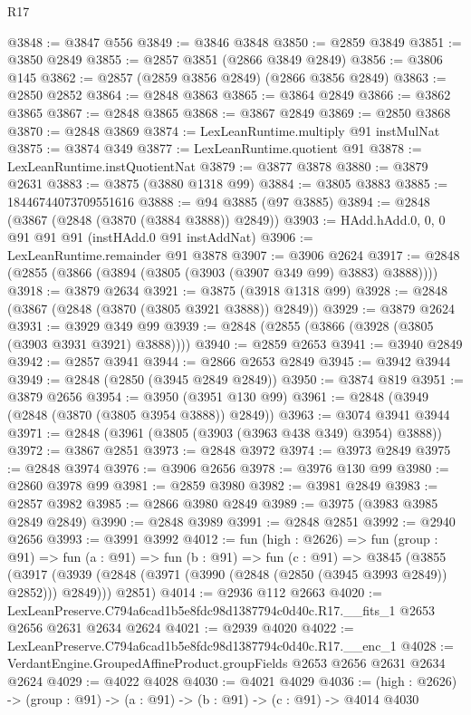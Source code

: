\begin{lexlean}{R17}
\begin{coremodule}
@3848 := @3847 @556
@3849 := @3846 @3848
@3850 := @2859 @3849
@3851 := @3850 @2849
@3855 := @2857 @3851 (@2866 @3849 @2849)
@3856 := @3806 @145
@3862 := @2857 (@2859 @3856 @2849) (@2866 @3856 @2849)
@3863 := @2850 @2852
@3864 := @2848 @3863
@3865 := @3864 @2849
@3866 := @3862 @3865
@3867 := @2848 @3865
@3868 := @3867 @2849
@3869 := @2850 @3868
@3870 := @2848 @3869
@3874 := LexLeanRuntime.multiply @91 instMulNat
@3875 := @3874 @349
@3877 := LexLeanRuntime.quotient @91
@3878 := LexLeanRuntime.instQuotientNat
@3879 := @3877 @3878
@3880 := @3879 @2631
@3883 := @3875 (@3880 @1318 @99)
@3884 := @3805 @3883
@3885 := 18446744073709551616
@3888 := @94 @3885 (@97 @3885)
@3894 := @2848 (@3867 (@2848 (@3870 (@3884 @3888)) @2849))
@3903 := HAdd.hAdd.{0, 0, 0} @91 @91 @91 (instHAdd.{0} @91 instAddNat)
@3906 := LexLeanRuntime.remainder @91 @3878
@3907 := @3906 @2624
@3917 := @2848 (@2855 (@3866 (@3894 (@3805 (@3903 (@3907 @349 @99) @3883) @3888))))
@3918 := @3879 @2634
@3921 := @3875 (@3918 @1318 @99)
@3928 := @2848 (@3867 (@2848 (@3870 (@3805 @3921 @3888)) @2849))
@3929 := @3879 @2624
@3931 := @3929 @349 @99
@3939 := @2848 (@2855 (@3866 (@3928 (@3805 (@3903 @3931 @3921) @3888))))
@3940 := @2859 @2653
@3941 := @3940 @2849
@3942 := @2857 @3941
@3944 := @2866 @2653 @2849
@3945 := @3942 @3944
@3949 := @2848 (@2850 (@3945 @2849 @2849))
@3950 := @3874 @819
@3951 := @3879 @2656
@3954 := @3950 (@3951 @130 @99)
@3961 := @2848 (@3949 (@2848 (@3870 (@3805 @3954 @3888)) @2849))
@3963 := @3074 @3941 @3944
@3971 := @2848 (@3961 (@3805 (@3903 (@3963 @438 @349) @3954) @3888))
@3972 := @3867 @2851
@3973 := @2848 @3972
@3974 := @3973 @2849
@3975 := @2848 @3974
@3976 := @3906 @2656
@3978 := @3976 @130 @99
@3980 := @2860 @3978 @99
@3981 := @2859 @3980
@3982 := @3981 @2849
@3983 := @2857 @3982
@3985 := @2866 @3980 @2849
@3989 := @3975 (@3983 @3985 @2849 @2849)
@3990 := @2848 @3989
@3991 := @2848 @2851
@3992 := @2940 @2656
@3993 := @3991 @3992
@4012 := fun (high : @2626) =>
  fun (group : @91) =>
  fun (a : @91) =>
  fun (b : @91) =>
  fun (c : @91) =>
  @3845
    (@3855
      (@3917 (@3939 (@2848 (@3971 (@3990 (@2848 (@2850 (@3945 @3993 @2849)) @2852))) @2849)))
      @2851)
@4014 := @2936 @112 @2663
@4020 := LexLeanPreserve.C794a6cad1b5e8fdc98d1387794c0d40c.R17.__fits_1
    @2653
    @2656
    @2631
    @2634
    @2624
@4021 := @2939 @4020
@4022 := LexLeanPreserve.C794a6cad1b5e8fdc98d1387794c0d40c.R17.__enc_1
@4028 := VerdantEngine.GroupedAffineProduct.groupFields @2653 @2656 @2631 @2634 @2624
@4029 := @4022 @4028
@4030 := @4021 @4029
@4036 := (high : @2626) -> (group : @91) -> (a : @91) -> (b : @91) -> (c : @91) -> @4014 @4030

\end{coremodule}
\end{lexlean}
